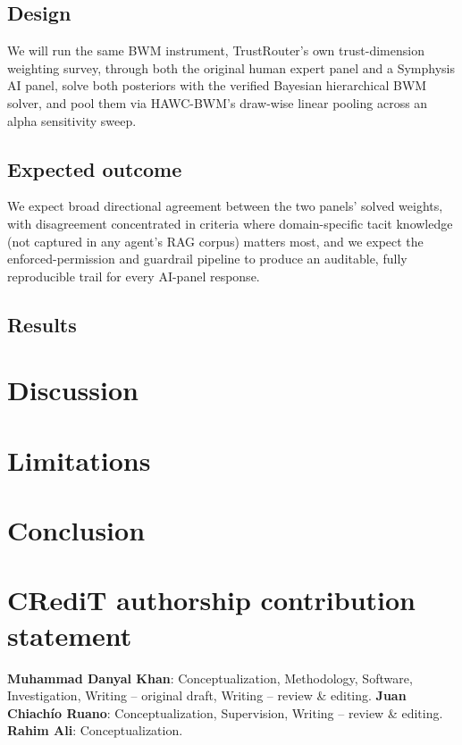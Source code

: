 \documentclass[11pt]{article}
\begin{document}
\subsection{Design}
We will run the same BWM instrument, TrustRouter's own trust-dimension
weighting survey, through both the original human expert panel and a
Symphysis AI panel, solve both posteriors with the verified Bayesian
hierarchical BWM solver, and pool them via HAWC-BWM's draw-wise linear
pooling across an alpha sensitivity sweep.

\subsection{Expected outcome}
We expect broad directional agreement between the two panels' solved
weights, with disagreement concentrated in criteria where domain-specific
tacit knowledge (not captured in any agent's RAG corpus) matters most,
and we expect the enforced-permission and guardrail pipeline to produce
an auditable, fully reproducible trail for every AI-panel response.

\subsection{Results}

\section{Discussion}

\section{Limitations}

\section{Conclusion}

\section*{CRediT authorship contribution statement}
\textbf{Muhammad Danyal Khan}: Conceptualization, Methodology, Software,
Investigation, Writing -- original draft, Writing -- review \& editing.
\textbf{Juan Chiach\'io Ruano}: Conceptualization, Supervision, Writing --
review \& editing. \textbf{Rahim Ali}: Conceptualization.
\end{document}
